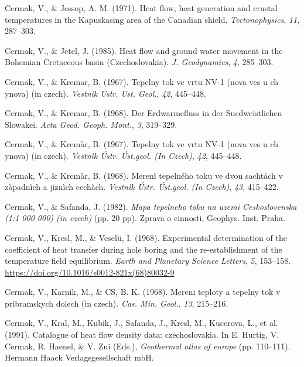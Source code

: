 \documentclass[draft,linenumbers]{agujournal2018}
\begin{document}
\leavevmode{}%
Cermak, V., \& Jessop, A. M. (1971). Heat flow, heat generation and
crustal temperatures in the {Kapuskasing} area of the {Canadian shield}.
\emph{Tectonophysics}, \emph{11}, 287--303.

\leavevmode{}%
Cermak, V., \& Jetel, J. (1985). Heat flow and ground water movement in
the {Bohemian Cretaceous} basin {(Czechoslovakia)}. \emph{J.
Geodynamics}, \emph{4}, 285--303.

\leavevmode{}%
Cermak, V., \& Krcmar, B. (1967). Tepelny tok ve vrtu NV-1 (nova ves u
ch ynova) (in czech). \emph{Vestnik Ustr. Ust. Geol.}, \emph{42},
445--448.

\leavevmode{}%
Cermak, V., \& Krcmar, B. (1968). {Der Erdwarmefluss in der
Suedweistlichen Slowakei}. \emph{Acta Geod. Geoph. Mont.}, \emph{3},
319--329.

\leavevmode{}%
Cermak, V., \& Krcmàr, B. (1967). Tepelny tok ve vrtu NV-1 (nova ves u
ch ynova) (in czech). \emph{Vestnìk Ústr. Úst.geol. (In Czech)},
\emph{42}, 445--448.

\leavevmode{}%
Cermak, V., \& Krcmàr, B. (1968). Merenì tepelného toku ve dvou sachtàch
v zàpadnìch a jiznìch cechàch. \emph{Vestnìk Ústr. Úst.geol. (In
Czech)}, \emph{43}, 415--422.

\leavevmode{}%
Cermak, V., \& Safanda, J. (1982). \emph{Mapa tepelneho toku na uzemi
{Ceskoslovenska} (1:1 000 000) (in czech)} (pp. 20 pp). Zprava o
cinnosti, Geophys. Inst. Praha.

\leavevmode{}%
Cermak, V., Kresl, M., \& Veselü, I. (1968). Experimental determination
of the coefficient of heat transfer during hole boring and the
re-establishment of the temperature field equilibrium. \emph{Earth and
Planetary Science Letters}, \emph{5}, 153--158.
\url{https://doi.org/10.1016/s0012-821x(68)80032-9}

\leavevmode{}%
Cermak, V., Karnik, M., \& CS, B. K. (1968). Mereni teploty a tepelny
tok v pribramskych dolech (in czech). \emph{Cas. Min. Geol.}, \emph{13},
215--216.

\leavevmode{}%
Cermak, V., Kral, M., Kubik, J., Safanda, J., Kresl, M., Kucerova, L.,
et al. (1991). Catalogue of heat flow density data: czechoslovakia. In
E. Hurtig, V. Cermak, R. Haenel, \& V. Zui (Eds.), \emph{Geothermal
atlas of europe} (pp. 110--111). Hermann Haack Verlagsgesellschaft mbH.
\end{document}
